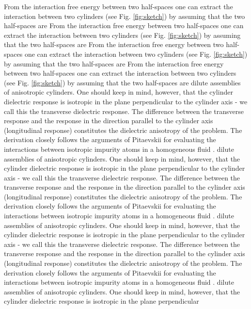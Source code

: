 \documentclass[onecolumn,letterpaper,amsmath,amssymb,floatfix,aps,superscriptaddress]{revtex4}
\begin{document}
From the interaction free energy between two half-spaces one can extract the interaction between two cylinders (see Fig. \ref{fig:sketch}) by assuming that the two half-spaces are 
From the interaction free energy between two half-spaces one can extract the interaction between two cylinders (see Fig. \ref{fig:sketch}) by assuming that the two half-spaces are 
From the interaction free energy between two half-spaces one can extract the interaction between two cylinders (see Fig. \ref{fig:sketch}) by assuming that the two half-spaces are 
From the interaction free energy between two half-spaces one can extract the interaction between two cylinders (see Fig. \ref{fig:sketch}) by assuming that the two half-spaces are 
dilute assemblies of anisotropic cylinders. One should keep in mind, however, that the cylinder dielectric response is isotropic in the plane perpendicular 
to the cylinder axis - we call this the transverse dielectric response. The difference between the transverse response and the response in the direction parallel 
to the cylinder axis (longitudinal response) constitutes the dielectric anisotropy of the problem. The derivation closely follows the arguments of Pitaevskii 
for evaluating the interactions between isotropic impurity 
atoms in a homogeneous fluid \cite{Pitaevskii}. 
dilute assemblies of anisotropic cylinders. One should keep in mind, however, that the cylinder dielectric response is isotropic in the plane perpendicular 
to the cylinder axis - we call this the transverse dielectric response. The difference between the transverse response and the response in the direction parallel 
to the cylinder axis (longitudinal response) constitutes the dielectric anisotropy of the problem. The derivation closely follows the arguments of Pitaevskii 
for evaluating the interactions between isotropic impurity 
atoms in a homogeneous fluid \cite{Pitaevskii}. 
dilute assemblies of anisotropic cylinders. One should keep in mind, however, that the cylinder dielectric response is isotropic in the plane perpendicular 
to the cylinder axis - we call this the transverse dielectric response. The difference between the transverse response and the response in the direction parallel 
to the cylinder axis (longitudinal response) constitutes the dielectric anisotropy of the problem. The derivation closely follows the arguments of Pitaevskii 
for evaluating the interactions between isotropic impurity 
atoms in a homogeneous fluid \cite{Pitaevskii}. 
dilute assemblies of anisotropic cylinders. One should keep in mind, however, that the cylinder dielectric response is isotropic in the plane perpendicular 
\end{document}
